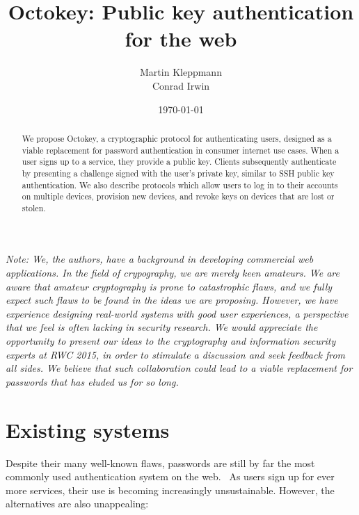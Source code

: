 \documentclass{acm_proc_article-sp}
\begin{document}
\title{Octokey: Public key authentication for the web}
\author{
    \alignauthor Martin Kleppmann \\ 
    \alignauthor Conrad Irwin \\ }
\date{\today}
\maketitle

\begin{abstract}
We propose Octokey, a cryptographic protocol for authenticating users, designed as a viable
replacement for password authentication in consumer internet use cases. When a user signs up to a
service, they provide a public key. Clients subsequently authenticate by presenting a challenge
signed with the user's private key, similar to SSH public key authentication. We also describe
protocols which allow users to log in to their accounts on multiple devices, provision new devices,
and revoke keys on devices that are lost or stolen.
\end{abstract}

\bigskip

\emph{Note: We, the authors, have a background in developing commercial web applications. In the
field of crypography, we are merely keen amateurs. We are aware that amateur cryptography is prone
to catastrophic flaws, and we fully expect such flaws to be found in the ideas we are proposing.
However, we have experience designing real-world systems with good user experiences, a perspective
that we feel is often lacking in security research. We would appreciate the opportunity to present
our ideas to the cryptography and information security experts at RWC 2015, in order to stimulate a
discussion and seek feedback from all sides. We believe that such collaboration could lead to a
viable replacement for passwords that has eluded us for so long.}

\section{Existing systems}

Despite their many well-known flaws, passwords are still by far the most commonly used
authentication system on the web.~\cite{Bonneau12} As users sign up for ever more services, their
use is becoming increasingly unsustainable. However, the alternatives are also unappealing:
\end{document}
